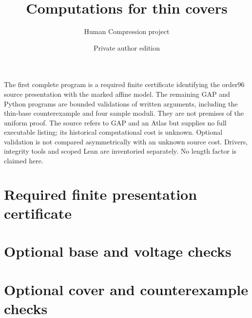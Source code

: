 \documentclass[a4paper,10pt]{article}
\title{Computations for thin covers}\author{Human Compression project}
\date{Private author edition}
\begin{document}
\maketitle
The first complete program is a required finite certificate identifying the
order96 source presentation with the marked affine model. The remaining
GAP and Python programs are bounded validations of written arguments,
including the thin-base counterexample and four sample moduli. They are
not premises of the uniform proof. The source refers to GAP and an Atlas
but supplies no full executable listing; its historical computational
cost is unknown. Optional validation is not compared asymmetrically
with an unknown source cost. Drivers, integrity tools and scoped Lean
are inventoried separately. No length factor is claimed here.
\section*{Required finite presentation certificate}
\section*{Optional base and voltage checks}
\section*{Optional cover and counterexample checks}
\end{document}
